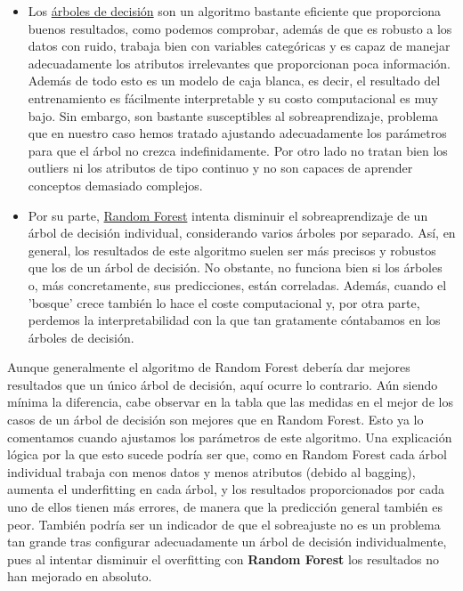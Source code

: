 \documentclass[a4paper,11pt]{article}
\begin{document}
\begin{itemize}
 \item Los \underline{árboles de decisión} son un algoritmo bastante eficiente que proporciona buenos resultados, como podemos comprobar, además de que es robusto a los datos con ruido, trabaja bien con variables categóricas y es capaz de manejar adecuadamente los atributos irrelevantes que proporcionan poca información. Además de todo esto es un modelo de caja blanca, es decir, el resultado del entrenamiento es fácilmente interpretable y su costo computacional es muy bajo. Sin embargo, son bastante susceptibles al sobreaprendizaje, problema que en nuestro caso hemos tratado ajustando adecuadamente los parámetros para que el árbol no crezca indefinidamente. Por otro lado no tratan bien los outliers ni los atributos de tipo continuo y no son capaces de aprender conceptos demasiado complejos. 
 
 \item Por su parte, \underline{Random Forest} intenta disminuir el sobreaprendizaje de un árbol de decisión individual, considerando varios árboles por separado. Así, en general, los resultados de este algoritmo suelen ser más precisos y robustos que los de un árbol de decisión. No obstante, no funciona bien si los árboles o, más concretamente, sus predicciones, están correladas. Además, cuando el 'bosque' crece también lo hace el coste computacional y, por otra parte, perdemos la interpretabilidad con la que tan gratamente cóntabamos en los árboles de decisión.
\end{itemize}

Aunque generalmente el algoritmo de Random Forest debería dar mejores resultados que un único árbol de decisión, aquí ocurre lo contrario. Aún siendo mínima la diferencia, cabe observar en la tabla que las medidas en el mejor de los casos de un árbol de decisión son mejores que en Random Forest. Esto ya lo comentamos cuando ajustamos los parámetros de este algoritmo. Una explicación lógica por la que esto sucede podría ser que, como en Random Forest cada árbol individual trabaja con menos datos y menos atributos (debido al bagging), aumenta el underfitting en cada árbol, y los resultados proporcionados por cada uno de ellos tienen más errores, de manera que la predicción general también es peor. También podría ser un indicador de que el sobreajuste no es un problema tan grande tras configurar adecuadamente un árbol de decisión individualmente, pues al intentar disminuir el overfitting con \textbf{Random Forest} los resultados no han mejorado en absoluto.  
\end{document}
